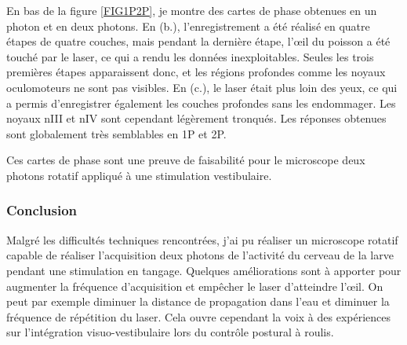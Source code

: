 En bas de la figure \ref{FIG1P2P}, je montre des cartes de phase obtenues en un photon et en deux photons. En (b.), l'enregistrement a été réalisé en quatre étapes de quatre couches, mais pendant la dernière étape, l'œil du poisson a été touché par le laser, ce qui a rendu les données inexploitables. Seules les trois premières étapes apparaissent donc, et les régions profondes comme les noyaux oculomoteurs ne sont pas visibles. En (c.), le laser était plus loin des yeux, ce qui a permis d'enregistrer également les couches profondes sans les endommager. Les noyaux nIII et nIV sont cependant légèrement tronqués. Les réponses obtenues sont globalement très semblables en 1P et 2P.

Ces cartes de phase sont une preuve de faisabilité pour le microscope deux photons rotatif appliqué à une stimulation vestibulaire.

\subsubsection{Conclusion}

Malgré les difficultés techniques rencontrées, j'ai pu réaliser un microscope rotatif capable de réaliser l'acquisition deux photons de l'activité du cerveau de la larve pendant une stimulation en tangage. Quelques améliorations sont à apporter pour augmenter la fréquence d'acquisition et empêcher le laser d'atteindre l'œil. On peut par exemple diminuer la distance de propagation dans l'eau et diminuer la fréquence de répétition du laser. Cela ouvre cependant la voix à des expériences sur l'intégration visuo-vestibulaire lors du contrôle postural à roulis.